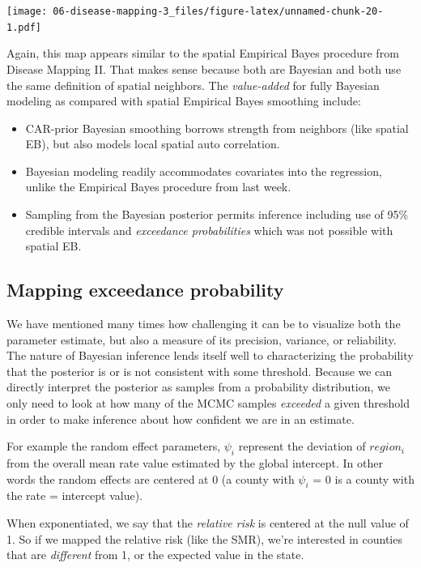 \documentclass[
]{book}
\providecommand{\tightlist}{%
  \setlength{\itemsep}{0pt}\setlength{\parskip}{0pt}}
\begin{document}
\texttt{[image: 06-disease-mapping-3\_files/figure-latex/unnamed-chunk-20-1.pdf]}

Again, this map appears similar to the spatial Empirical Bayes procedure from Disease Mapping II. That makes sense because both are Bayesian and both use the same definition of spatial neighbors. The \emph{value-added} for fully Bayesian modeling as compared with spatial Empirical Bayes smoothing include:

\begin{itemize}
\tightlist
\item
  CAR-prior Bayesian smoothing borrows strength from neighbors (like spatial EB), but also models local spatial auto correlation.
\item
  Bayesian modeling readily accommodates covariates into the regression, unlike the Empirical Bayes procedure from last week.
\item
  Sampling from the Bayesian posterior permits inference including use of 95\% credible intervals and \emph{exceedance probabilities} which was not possible with spatial EB.
\end{itemize}

\hypertarget{mapping-exceedance-probability}{%
\subsection{Mapping exceedance probability}\label{mapping-exceedance-probability}}

We have mentioned many times how challenging it can be to visualize both the parameter estimate, but also a measure of its precision, variance, or reliability. The nature of Bayesian inference lends itself well to characterizing the probability that the posterior is or is not consistent with some threshold. Because we can directly interpret the posterior as samples from a probability distribution, we only need to look at how many of the MCMC samples \emph{exceeded} a given threshold in order to make inference about how confident we are in an estimate.

For example the random effect parameters, \(\psi_i\) represent the deviation of \(region_i\) from the overall mean rate value estimated by the global intercept. In other words the random effects are centered at 0 (a county with \(\psi_i\) = 0 is a county with the rate = intercept value).

When exponentiated, we say that the \emph{relative risk} is centered at the null value of 1. So if we mapped the relative risk (like the SMR), we're interested in counties that are \emph{different} from 1, or the expected value in the state.
\end{document}

